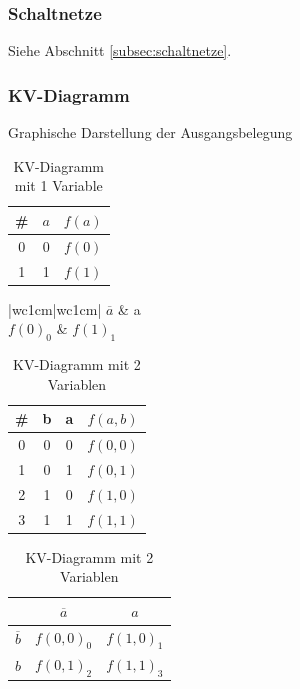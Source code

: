 \documentclass[10pt,a4paper]{scrartcl}
\begin{document}
\subsubsection{Schaltnetze}
Siehe Abschnitt \ref{subsec:schaltnetze}.

\subsubsection{KV-Diagramm}
Graphische Darstellung der Ausgangsbelegung
\begin{table}[h!]
\centering
	\begin{tabular}{ccc}
		\# & $ a $ & $ f(a) $\\
		\hline
		0 & 0 & $ f(0) $\\
		1 & 1 & $ f(1) $\\
	\end{tabular}
\quad
	\begin{tabular}{|wc{1cm}|wc{1cm}|}
		$ \overline{a} $ & a \\ \hline
		$ f(0)_{0} $ & $ f(1)_1 $ \\ \hline
	\end{tabular}
\caption{KV-Diagramm mit 1 Variable}
\end{table}
\begin{table}[h!]
	\centering
	\begin{tabular}{c|cc|c}
		\# & b & a & $ f(a,b) $\\ \hline
		0 & 0 & 0 & $ f(0,0) $\\
		1 & 0 & 1 & $ f(0,1) $\\
		2 & 1 & 0 & $ f(1,0) $\\
		3 & 1 & 1 & $ f(1,1) $\\
	\end{tabular}
\quad
	\begin{tabular}{c|c|c|}
		 & $ \overline{a} $  &  $ a $\\ \hline
		 $ \overline{b} $  &  $ f(0,0)_{0} $  &  $ f(1,0)_{1} $ \\ \hline
		 $ b $ & $ f(0,1)_2 $  &  $ f(1,1) _3$ \\ \hline
	\end{tabular}	
\caption{KV-Diagramm mit 2 Variablen}
\end{table}
\end{document}
